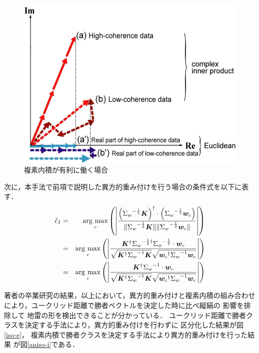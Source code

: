 ﻿\documentclass[12pt,oneside]{jsbook}
\newcommand{\argmax}{\mathop{\rm arg~max}\limits}
\begin{document}
\begin{figure}[btp]
 \begin{center}
\includegraphics[width =\hsize ]{innerproduct.png}
\caption{複素内積が有利に働く場合}
\label{ip}
  \end{center}
\end{figure}

次に，本手法で前項で説明した異方的重み付けを行う場合の条件式を以下に表す．
\begin{eqnarray}
\tilde{c}_I &=& \argmax_{c} \left( \left|
\frac{\left({\Sigma_w}^{-\frac{1}{2}}{\bm K}\right)^{\dagger}\cdot
\left({\Sigma_w}^{-\frac{1}{2}}{\bm w_c}\right)
}{ \|{\Sigma_w}^{-\frac{1}{2}}{\bm K}\| \|{\Sigma_w}^{-\frac{1}{2}}{\bm w_c} \| }
                                   \right| \right)\\
 &=& \argmax_{c} \left( \left|
\frac{{\bm K}^{\dagger}{\Sigma_w}^{-\frac{1}{2}
\dagger}{\Sigma_w}^{-\frac{1}{2}}\cdot{\bm w_c}
}{ \sqrt{{\bm K}^{\dagger}{\Sigma_w}^{-1}{\bm K}}\sqrt{{\bm
w_c}^{\dagger}{\Sigma_w}^{-1}{\bm w_c}} }
                                   \right| \right)\\
 &=& \argmax_{c} \left( \left|
\frac{{\bm K}^{\dagger}{\Sigma_w}^{-1}\cdot{\bm w_c}
}{ \sqrt{{\bm K}^{\dagger}{\Sigma_w}^{-1}{\bm K}}\sqrt{{\bm
w_c}^{\dagger}{\Sigma_w}^{-1}{\bm w_c}} }
                                   \right| \right)
\end{eqnarray}

著者の卒業研究の結果，以上において，異方的重み付けと複素内積の組み合わせ
により，ユークリッド距離で勝者ベクトルを決定した時に比べ縦縞の
影響を排除して
地雷の形を検出できることが分かっている．
ユークリッド距離で勝者クラスを決定する手法により，異方的重み付けを行わずに
区分化した結果が図\ref{iso-e}，
複素内積で勝者クラスを決定する手法により異方的重み付けを行った結果
が図\ref{aniso-i}である．
\end{document}

